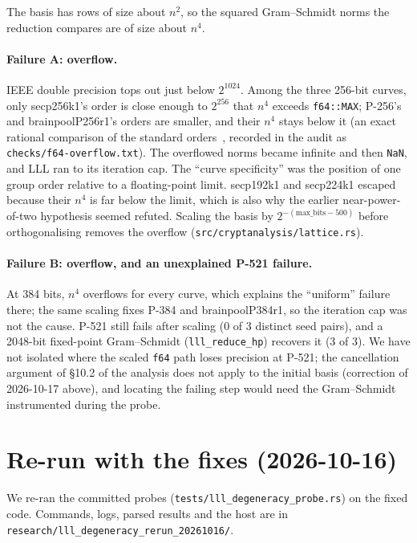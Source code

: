 \documentclass[10pt,a4paper]{article}
\begin{document}
The basis has rows of size about $n^2$, so the squared Gram--Schmidt
norms the reduction compares are of size about $n^4$.

\paragraph{Failure A: overflow.} IEEE double precision tops out just
below $2^{1024}$. Among the three 256-bit curves, only secp256k1's
order is close enough to $2^{256}$ that $n^4$ exceeds
\texttt{f64::MAX}; P-256's and brainpoolP256r1's orders are smaller,
and their $n^4$ stays below it (an exact rational comparison of the
standard orders~\cite{fips186,sec2}, recorded in the audit as
\texttt{checks/f64-overflow.txt}). The overflowed norms became
infinite and then \texttt{NaN}, and LLL ran to its iteration cap. The
``curve specificity'' was the position of one group order relative to
a floating-point limit. secp192k1 and secp224k1 escaped because their
$n^4$ is far below the limit, which is also why the earlier
near-power-of-two hypothesis seemed refuted. Scaling the basis by
$2^{-(\text{max\_bits} - 500)}$ before orthogonalising removes the
overflow (\texttt{src/cryptanalysis/lattice.rs}).

\paragraph{Failure B: overflow, and an unexplained P-521 failure.} At
384 bits, $n^4$ overflows for every curve, which explains the
``uniform'' failure there; the same scaling fixes P-384 and
brainpoolP384r1, so the iteration cap was not the cause. P-521 still
fails after scaling (0 of 3 distinct seed pairs), and a 2048-bit
fixed-point Gram--Schmidt (\texttt{lll\_reduce\_hp}) recovers it
(3 of 3). We have not isolated where the scaled \texttt{f64} path
loses precision at P-521; the cancellation argument of \S10.2 of the
analysis does not apply to the initial basis (correction of
2026-10-17 above), and locating the failing step would need the
Gram--Schmidt instrumented during the probe.

\section{Re-run with the fixes (2026-10-16)}
\label{sec:rerun}

We re-ran the committed probes (\nolinkurl{tests/lll_degeneracy_probe.rs})
on the fixed code. Commands, logs, parsed results and the host are in
\nolinkurl{research/lll_degeneracy_rerun_20261016/}.
\end{document}
